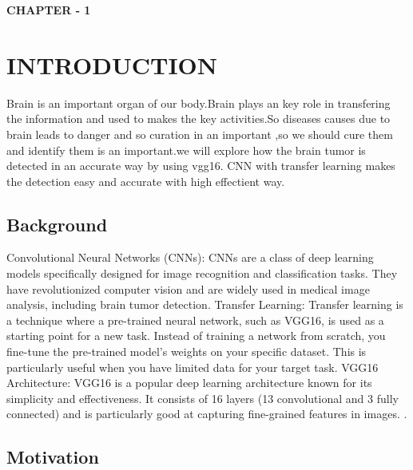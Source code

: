 \newpage
{}
\begin{center}
    \textbf{\LARGE CHAPTER - 1}
\end{center}

\section{INTRODUCTION}

 Brain is an important organ of our body.Brain plays an key role in transfering the information and used to makes the key activities.So diseases causes due to brain leads to danger and so curation in an important ,so we should cure them and identify them is an important.we will explore how the brain tumor is detected in an accurate way by using vgg16.  CNN with transfer learning makes the detection easy and accurate with high effectient way.
\vspace{0.25cm}
\subsection{Background}

 Convolutional Neural Networks (CNNs): CNNs are a class of deep learning models specifically designed for image recognition and classification tasks. They have revolutionized computer vision and are widely used in medical image analysis, including brain tumor detection.
Transfer Learning: Transfer learning is a technique where a pre-trained neural network, such as VGG16, is used as a starting point for a new task. Instead of training a network from scratch, you fine-tune the pre-trained model's weights on your specific dataset. This is particularly useful when you have limited data for your target task.
VGG16 Architecture: VGG16 is a popular deep learning architecture known for its simplicity and effectiveness. It consists of 16 layers (13 convolutional and 3 fully connected) and is particularly good at capturing fine-grained features in images. \cite{einstein}.



\vspace{0.25cm}
\subsection{Motivation} 

